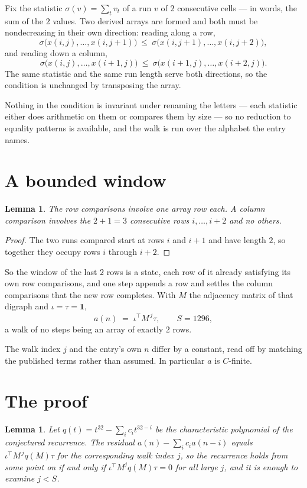 \documentclass[11pt,a4paper]{article}
\theoremstyle{plain}
\newtheorem{lemma}[theorem]{Lemma}
\theoremstyle{definition}
\begin{document}
Fix the statistic $\sigma(v)=\sum_{t} v_t$ of a run $v$ of $2$ consecutive cells --- in words,
the sum of the $2$ values. Two derived arrays are formed and both must be
nondecreasing in their own direction: reading along a row,
\[
\sigma\bigl(x(i,j),\dots,x(i,j{+}1)\bigr)\ \le\
\sigma\bigl(x(i,j{+}1),\dots,x(i,j{+}2)\bigr),
\]
and reading down a column,
\[
\sigma\bigl(x(i,j),\dots,x(i{+}1,j)\bigr)\ \le\
\sigma\bigl(x(i{+}1,j),\dots,x(i{+}2,j)\bigr).
\]
The same statistic and the same run length serve both directions, so the condition is
unchanged by transposing the array.

Nothing in the condition is invariant under renaming the letters --- each statistic either does
arithmetic on them or compares them by size --- so no reduction to equality patterns is
available, and the walk is run over the alphabet the entry names.

\section{A bounded window}

\begin{lemma}\label{lem:win}
The row comparisons involve one array row each. A column comparison involves the
$2+1=3$ consecutive rows $i,\dots,i{+}2$ and no others.
\end{lemma}

\begin{proof}
The two runs compared start at rows $i$ and $i+1$ and have length $2$, so together they
occupy rows $i$ through $i+2$.
\end{proof}

So the window of the last $2$ rows is a state, each row of it already satisfying its own row
comparisons, and one step appends a row and settles the column comparisons that the new row
completes. With $M$ the adjacency matrix of that digraph and $\iota=\tau=\mathbf{1}$,
\[
a(n)\;=\;\iota^{\!\top}M^{\,j}\tau ,\qquad S=1296,
\]
a walk of no steps being an array of exactly $2$ rows.

The walk index $j$ and the entry's own $n$ differ by a constant, read off by matching the
published terms rather than assumed. In particular $a$ is $C$-finite.

\section{The proof}

\begin{lemma}\label{lem:crit}
Let $q(t)=t^{32}-\sum_i c_it^{32-i}$ be the characteristic polynomial of the
conjectured recurrence. The residual $a(n)-\sum_ic_ia(n-i)$ equals
$\iota^{\!\top}M^{\,j}q(M)\tau$ for the corresponding walk index $j$, so the recurrence
holds from some point on if and only if $\iota^{\!\top}M^{j}q(M)\tau=0$ for all large $j$,
and it is enough to examine $j<S$.
\end{lemma}
\end{document}

